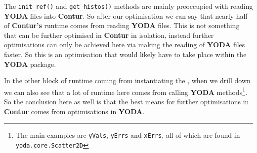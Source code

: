 The \texttt{init\_ref()} and \texttt{get\_histos()} methods are mainly preoccupied with reading \textbf{YODA} files into \textbf{Contur}. So after our optimisation we can say that nearly half of \textbf{Contur's} runtime comes from reading \textbf{YODA} files. This is not something that can be further optimised in \textbf{Contur} in isolation, instead further optimisations can only be achieved here via making the reading of \textbf{YODA} files faster. So this is an optimisation that would likely have to take place within the \textbf{YODA} package.

In the other block of runtime coming from instantiating the , when we drill down we can also see that a lot of runtime here comes from calling \textbf{YODA} methods\footnote{The main examples are \texttt{yVals}, \texttt{yErrs} and \texttt{xErrs}, all of which are found in \texttt{yoda.core.Scatter2D}}. So the conclusion here as well is that the best means for further optimisations in \textbf{Contur} comes from optimisations in  \textbf{YODA}.
